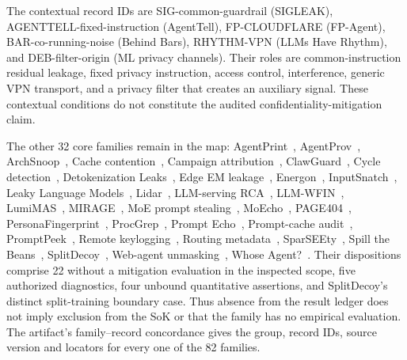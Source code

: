 The contextual record IDs are SIG-common-guardrail (SIGLEAK), AGENTTELL-fixed-instruction (AgentTell), FP-CLOUDFLARE (FP-Agent), BAR-co-running-noise (Behind Bars), RHYTHM-VPN (LLMs Have Rhythm), and DEB-filter-origin (ML privacy channels). Their roles are common-instruction residual leakage, fixed privacy instruction, access control, interference, generic VPN transport, and a privacy filter that creates an auxiliary signal. These contextual conditions do not constitute the audited confidentiality-mitigation claim.

The other 32 core families remain in the map: AgentPrint~\cite{agentprint2025}, AgentProv~\cite{wang2026agentprov}, ArchSnoop~\cite{weng2026archsnoop}, Cache contention~\cite{abubakar2026contention}, Campaign attribution~\cite{park2026crosscampaign}, ClawGuard~\cite{gan2026clawguard}, Cycle detection~\cite{george2025cycles}, Detokenization Leaks~\cite{weiss2026detokenization}, Edge EM leakage~\cite{alhalawani2026physicaledge}, Energon~\cite{chaudhuri2025energon}, InputSnatch~\cite{inputsnatch2024}, Leaky Language Models~\cite{majidi2026leakylms}, Lidar~\cite{wang2026lidar}, LLM-serving RCA~\cite{scheinert2026rca}, LLM-WFIN~\cite{jiao2025llmwfin}, LumiMAS~\cite{solomon2026lumimas}, MIRAGE~\cite{revankar2026mirage}, MoE prompt stealing~\cite{yona2024stealing}, MoEcho~\cite{ding2025moecho}, PAGE404~\cite{nazaraliyev2026page404}, PersonaFingerprint~\cite{song2026personafingerprint}, ProcGrep~\cite{oderinwale2026procgrep}, Prompt Echo~\cite{prompt_echo2026}, Prompt-cache audit~\cite{gu2025promptcaching}, PromptPeek~\cite{promptpeek2025}, Remote keylogging~\cite{weiss2024prompt}, Routing metadata~\cite{chen2026routingmetadata}, SparSEEty~\cite{jo2026sparseety}, Spill the Beans~\cite{spillbeans2025}, SplitDecoy~\cite{politis2026splitdecoy}, Web-agent unmasking~\cite{fayolle2026webagents}, Whose Agent?~\cite{kang2026whoseagent}. Their dispositions comprise 22 without a mitigation evaluation in the inspected scope, five authorized diagnostics, four unbound quantitative assertions, and SplitDecoy's distinct split-training boundary case. Thus absence from the result ledger does not imply exclusion from the SoK or that the family has no empirical evaluation. The artifact's family--record concordance gives the group, record IDs, source version and locators for every one of the 82 families.

